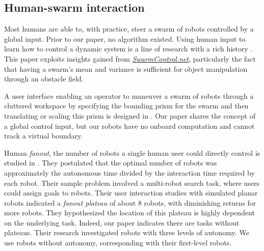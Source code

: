  \subsection{Human-swarm interaction}
 
  Most humans are able to, with practice, steer a swarm of robots controlled by a global input. Prior to our paper, no algorithm existed. Using human input to learn how to control a dynamic system is a line of research with a rich history \cite{argall2009, abbeel2010}. This paper exploits insights gained from \href{http://www.swarmcontrol.net}{\emph{SwarmControl.net}}, particularly the fact that having a swarm's mean and variance is sufficient for object manipulation through an obstacle field.
  
 A user interface enabling an operator to maneuver a swarm of robots through a cluttered workspace by specifying the bounding prism for the swarm and then translating or scaling this prism is designed in \cite{ayanian2014controlling}. Our paper shares the concept of a global control input, but our robots have no onboard computation and cannot track a virtual boundary.
 
Human \emph{fanout}, the number of robots a single human user could directly control is studied in \cite{Jr2004}.  %
They postulated that the optimal number of robots was approximately  the autonomous time  divided by the interaction time required by each robot.  Their sample problem involved a multi-robot search task, where users could assign goals to robots.  Their user interaction studies with simulated planar robots  indicated a \emph{fanout plateau} of about 8 robots, with diminishing returns for more robots.   They hypothesized the location of this plateau is highly dependent on the underlying task.  Indeed, our paper indicates there are tasks without plateaus. %
Their research investigated robots with three levels of autonomy.  We use robots without autonomy, corresponding with their first-level robots.







